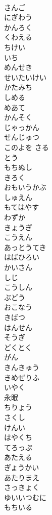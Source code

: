 \documentclass[8pt]{extreport}
\begin{document}
\begin{CJK}{UTF8}{min}
\\	さんご
\\	にぎわう
\\	かんろく
\\	くわえる
\\	ちけい
\\	いち
\\	めんせき
\\	せいたいけい
\\	かたみち
\\	しめる
\\	めあて
\\	かんそく
\\	じゃっかん
\\	せんじゅつ
\\	このよを さる
\\	とう
\\	もちぬし
\\	きろく
\\	おもいうかぶ
\\	しゅえん
\\	もてはやす
\\	わずか
\\	きょうぎ
\\	こうえん
\\	あっとうてき
\\	はばひろい
\\	かいさん
\\	しじ
\\	こうしん
\\	ぶどう
\\	おこなう
\\	きばつ
\\	はんせん
\\	そうぎ
\\	どくとく
\\	がん
\\	きんきゅう
\\	きめぜりふ
\\	いやく
\\	永眠
\\	ちりょう
\\	さくし
\\	けんい
\\	はやくち
\\	てろっぷ
\\	あたえる
\\	ぎょうかい
\\	あたりまえ
\\	さっきょく
\\	ゆいいつむに
\\	もちいる

\end{CJK}
\end{document}
